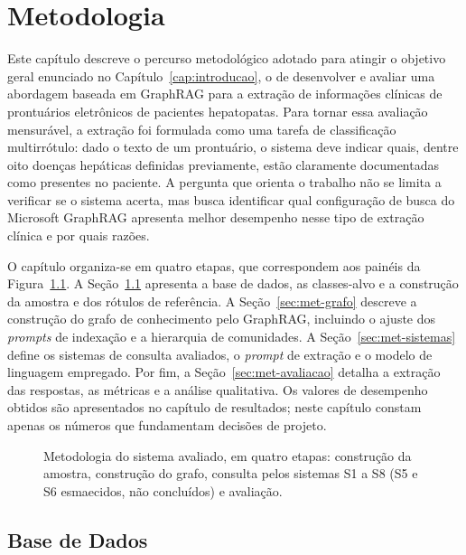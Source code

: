\chapter{Metodologia}\label{cap:metodologia}

Este capítulo descreve o percurso metodológico adotado para atingir o objetivo geral enunciado no Capítulo~\ref{cap:introducao}, o de desenvolver e avaliar uma abordagem baseada em GraphRAG para a extração de informações clínicas de prontuários eletrônicos de pacientes hepatopatas. Para tornar essa avaliação mensurável, a extração foi formulada como uma tarefa de classificação multirrótulo: dado o texto de um prontuário, o sistema deve indicar quais, dentre oito doenças hepáticas definidas previamente, estão claramente documentadas como presentes no paciente. A pergunta que orienta o trabalho não se limita a verificar se o sistema acerta, mas busca identificar qual configuração de busca do Microsoft GraphRAG apresenta melhor desempenho nesse tipo de extração clínica e por quais razões.

O capítulo organiza-se em quatro etapas, que correspondem aos painéis da Figura~\ref{fig:met-visao-geral}. A Seção~\ref{sec:met-dados} apresenta a base de dados, as classes-alvo e a construção da amostra e dos rótulos de referência. A Seção~\ref{sec:met-grafo} descreve a construção do grafo de conhecimento pelo GraphRAG, incluindo o ajuste dos \textit{prompts} de indexação e a hierarquia de comunidades. A Seção~\ref{sec:met-sistemas} define os sistemas de consulta avaliados, o \textit{prompt} de extração e o modelo de linguagem empregado. Por fim, a Seção~\ref{sec:met-avaliacao} detalha a extração das respostas, as métricas e a análise qualitativa. Os valores de desempenho obtidos são apresentados no capítulo de resultados; neste capítulo constam apenas os números que fundamentam decisões de projeto.

\begin{figure}[!htbp]
\centering
\resizebox{\textwidth}{!}{}
\caption[Metodologia do sistema avaliado]{Metodologia do sistema avaliado, em quatro etapas: construção da amostra, construção do grafo, consulta pelos sistemas S1 a S8 (S5 e S6 esmaecidos, não concluídos) e avaliação.}
\label{fig:met-visao-geral}
\par{}
\end{figure}

\section{Base de Dados}\label{sec:met-dados}


